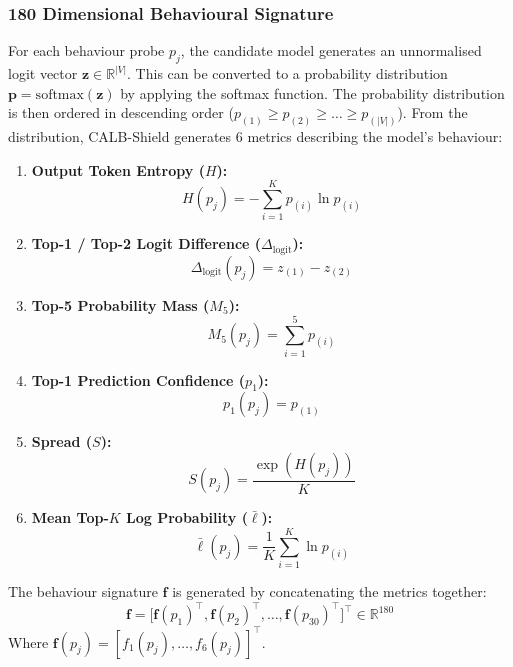 \subsubsection{180 Dimensional Behavioural Signature}
For each behaviour probe $p_j$, the candidate model generates an unnormalised logit vector $\mathbf{z} \in \mathbb{R}^{|V|}$. This can be converted to a probability distribution $\mathbf{p} = \text{softmax}(\mathbf{z})$ by applying the softmax function. The probability distribution is then ordered in descending order ($p_{(1)} \ge p_{(2)} \ge \dots \ge p_{(|V|)}$). From the distribution, CALB-Shield generates 6 metrics describing the model's behaviour:
\begin{enumerate}
    \item \textbf{Output Token Entropy ($H$):}
    \begin{equation}
    H(p_j) = -\sum_{i=1}^{K} p_{(i)} \ln p_{(i)}
    \end{equation}
    \item \textbf{Top-1 / Top-2 Logit Difference ($\Delta_{\text{logit}}$):}
    \begin{equation}
    \Delta_{\text{logit}}(p_j) = z_{(1)} - z_{(2)}
    \end{equation}
    \item \textbf{Top-5 Probability Mass ($M_5$):}
    \begin{equation}
    M_5(p_j) = \sum_{i=1}^{5} p_{(i)}
    \end{equation}
    \item \textbf{Top-1 Prediction Confidence ($p_1$):}
    \begin{equation}
    p_1(p_j) = p_{(1)}
    \end{equation}
    \item \textbf{Spread ($S$):}
    \begin{equation}
    S(p_j) = \frac{\exp(H(p_j))}{K}
    \end{equation}
    \item \textbf{Mean Top-$K$ Log Probability ($\bar{\ell}$):}
    \begin{equation}
    \bar{\ell}(p_j) = \frac{1}{K} \sum_{i=1}^{K} \ln p_{(i)}
    \end{equation}
\end{enumerate}

The behaviour signature $\mathbf{f}$ is generated by concatenating the metrics together:
\begin{equation}
\mathbf{f} = \big[ \mathbf{f}(p_1)^\top, \mathbf{f}(p_2)^\top, \dots, \mathbf{f}(p_{30})^\top \big]^\top \in \mathbb{R}^{180}
\end{equation}
Where $\mathbf{f}(p_j) = [f_1(p_j), \dots, f_6(p_j)]^\top$.

